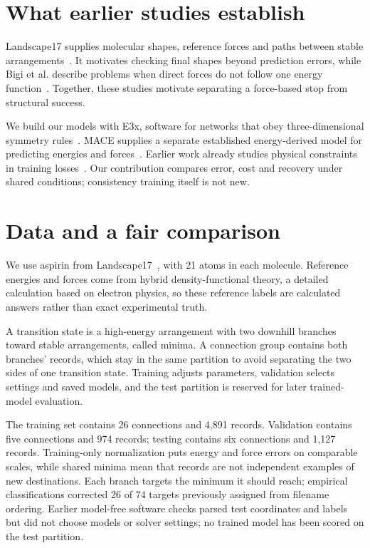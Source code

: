 \documentclass{article}
\begin{document}
\section{What earlier studies establish}
Landscape17 supplies molecular shapes, reference forces and paths between stable arrangements~\cite{landscape}. It motivates checking final shapes beyond prediction errors, while Bigi et al. describe problems when direct forces do not follow one energy function~\cite{bigi}. Together, these studies motivate separating a force-based stop from structural success.

We build our models with E3x, software for networks that obey three-dimensional symmetry rules~\cite{e3x}. MACE supplies a separate established energy-derived model for predicting energies and forces~\cite{mace}. Earlier work already studies physical constraints in training losses~\cite{takamoto}. Our contribution compares error, cost and recovery under shared conditions; consistency training itself is not new.

\section{Data and a fair comparison}
We use aspirin from Landscape17~\cite{landscape}, with 21 atoms in each molecule. Reference energies and forces come from hybrid density-functional theory, a detailed calculation based on electron physics, so these reference labels are calculated answers rather than exact experimental truth.

A transition state is a high-energy arrangement with two downhill branches toward stable arrangements, called minima. A connection group contains both branches' records, which stay in the same partition to avoid separating the two sides of one transition state. Training adjusts parameters, validation selects settings and saved models, and the test partition is reserved for later trained-model evaluation.

The training set contains 26 connections and 4,891 records. Validation contains five connections and 974 records; testing contains six connections and 1,127 records. Training-only normalization puts energy and force errors on comparable scales, while shared minima mean that records are not independent examples of new destinations. Each branch targets the minimum it should reach; empirical classifications corrected 26 of 74 targets previously assigned from filename ordering. Earlier model-free software checks parsed test coordinates and labels but did not choose models or solver settings; no trained model has been scored on the test partition.
\end{document}
